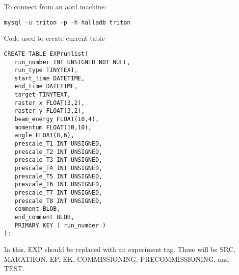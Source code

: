 \documentclass[10pt]{article}
\begin{document}
To connect from an aonl machine:
\begin{verbatim}
mysql -u triton -p -h halladb triton
\end{verbatim}

Code used to create current table

\begin{verbatim}
CREATE TABLE EXPrunlist(
   run_number INT UNSIGNED NOT NULL,
   run_type TINYTEXT,
   start_time DATETIME,
   end_time DATETIME,
   target TINYTEXT,
   raster_x FLOAT(3,2),
   raster_y FLOAT(3,2),
   beam_energy FLOAT(10,4),
   momentum FLOAT(10,10),
   angle FLOAT(8,6),
   prescale_T1 INT UNSIGNED,
   prescale_T2 INT UNSIGNED,
   prescale_T3 INT UNSIGNED,
   prescale_T4 INT UNSIGNED,
   prescale_T5 INT UNSIGNED,
   prescale_T6 INT UNSIGNED,
   prescale_T7 INT UNSIGNED,
   prescale_T8 INT UNSIGNED,
   comment BLOB,
   end_comment BLOB,
   PRIMARY KEY ( run_number )
);
\end{verbatim}

In this, EXP should be replaced with an experiment tag. These will be SRC, MARATHON, EP, EK, COMMISSIONING, PRECOMMISSIONING, and TEST. 
\end{document}
